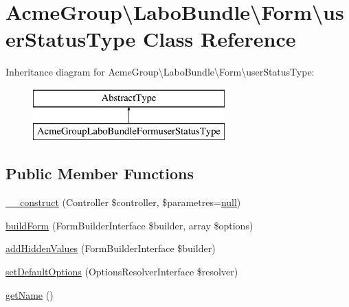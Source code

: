 \hypertarget{class_acme_group_1_1_labo_bundle_1_1_form_1_1user_status_type}{\section{Acme\+Group\textbackslash{}Labo\+Bundle\textbackslash{}Form\textbackslash{}user\+Status\+Type Class Reference}
\label{class_acme_group_1_1_labo_bundle_1_1_form_1_1user_status_type}
}
Inheritance diagram for Acme\+Group\textbackslash{}Labo\+Bundle\textbackslash{}Form\textbackslash{}user\+Status\+Type\+:\begin{figure}[H]
\begin{center}
\leavevmode
\includegraphics[height=2.000000cm]{class_acme_group_1_1_labo_bundle_1_1_form_1_1user_status_type}
\end{center}
\end{figure}
\subsection*{Public Member Functions}
\begin{DoxyCompactItemize}
\item 
\hyperlink{class_acme_group_1_1_labo_bundle_1_1_form_1_1user_status_type_af8aba9a6c133fccc2541bdf181d3f00d}{\+\_\+\+\_\+construct} (Controller \$controller, \$parametres=\hyperlink{validate_8js_afb8e110345c45e74478894341ab6b28e}{null})
\item 
\hyperlink{class_acme_group_1_1_labo_bundle_1_1_form_1_1user_status_type_a61e3c8d01e6cc4c0f5bee2b1ea641687}{build\+Form} (Form\+Builder\+Interface \$builder, array \$options)
\item 
\hyperlink{class_acme_group_1_1_labo_bundle_1_1_form_1_1user_status_type_ad1d5bd32cf5d4a6d4965b072b679e594}{add\+Hidden\+Values} (Form\+Builder\+Interface \$builder)
\item 
\hyperlink{class_acme_group_1_1_labo_bundle_1_1_form_1_1user_status_type_a21de59c1e6e1fe9e1358140389634b9d}{set\+Default\+Options} (Options\+Resolver\+Interface \$resolver)
\item 
\hyperlink{class_acme_group_1_1_labo_bundle_1_1_form_1_1user_status_type_a8e2471befc717c4a81a17647196e4935}{get\+Name} ()
\end{DoxyCompactItemize}


